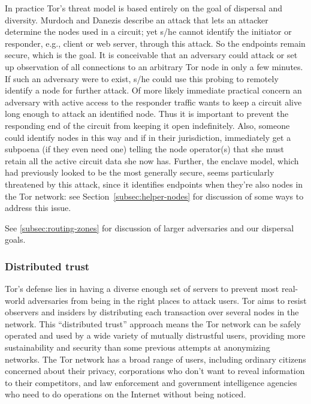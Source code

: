 \documentclass{llncs}
\begin{document}
In practice Tor's threat model is based entirely on the goal of
dispersal and diversity. Murdoch and Danezis describe an attack
\cite{attack-tor-oak05} that lets an attacker determine the nodes used
in a circuit; yet s/he cannot identify the initiator or responder,
e.g., client or web server, through this attack. So the endpoints
remain secure, which is the goal. It is conceivable that an
adversary could attack or set up observation of all connections
to an arbitrary Tor node in only a few minutes.  If such an adversary
were to exist, s/he could use this probing to remotely identify a node
for further attack.  Of more likely immediate practical concern
an adversary with active access to the responder traffic
wants to keep a circuit alive long enough to attack an identified
node. Thus it is important to prevent the responding end of the circuit
from keeping it open indefinitely. 
Also, someone could identify nodes in this way and if in their
jurisdiction, immediately get a subpoena (if they even need one)
telling the node operator(s) that she must retain all the active
circuit data she now has.
Further, the enclave model, which had previously looked to be the most
generally secure, seems particularly threatened by this attack, since
it identifies endpoints when they're also nodes in the Tor network:
see Section~\ref{subsec:helper-nodes} for discussion of some ways to
address this issue.

See \ref{subsec:routing-zones} for discussion of larger
adversaries and our dispersal goals.

\subsubsection{Distributed trust}
Tor's defense lies in having a diverse enough set of servers
to prevent most real-world
adversaries from being in the right places to attack users.
Tor aims to resist observers and insiders by distributing each transaction
over several nodes in the network.  This ``distributed trust'' approach
means the Tor network can be safely operated and used by a wide variety
of mutually distrustful users, providing more sustainability and security
than some previous attempts at anonymizing networks.
The Tor network has a broad range of users, including ordinary citizens
concerned about their privacy, corporations
who don't want to reveal information to their competitors, and law
enforcement and government intelligence agencies who need
to do operations on the Internet without being noticed.
\end{document}
